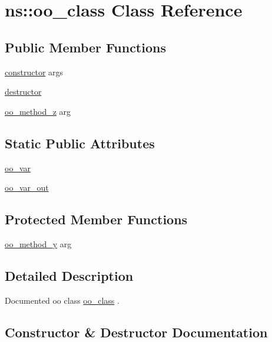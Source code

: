 \hypertarget{classns_1_1oo__class}{}\section{ns\+::oo\+\_\+class Class Reference}
\label{classns_1_1oo__class}
\subsection*{Public Member Functions}
\begin{DoxyCompactItemize}
\item 
\mbox{\hyperlink{classns_1_1oo__class_aa26b64151d4b4b0e8b4977aae7048f9b}{constructor}} args
\item 
\mbox{\hyperlink{classns_1_1oo__class_af148cfc1c090a05986c68ac9452a510a}{destructor}}
\item 
\mbox{\hyperlink{classns_1_1oo__class_a8a3cfbae3b3fca463f08adb9174a5fe8}{oo\+\_\+method\+\_\+z}} arg
\end{DoxyCompactItemize}
\subsection*{Static Public Attributes}
\begin{DoxyCompactItemize}
\item 
\mbox{\hyperlink{classns_1_1oo__class_a741f11f4a2db3876205658d4a9a279ba}{oo\+\_\+var}}
\item 
\mbox{\hyperlink{classns_1_1oo__class_af46293ede16067c38ca2901416cad8ee}{oo\+\_\+var\+\_\+out}}
\end{DoxyCompactItemize}
\subsection*{Protected Member Functions}
\begin{DoxyCompactItemize}
\item 
\mbox{\hyperlink{classns_1_1oo__class_ad07feb192f34010ed66d123338c7acdd}{oo\+\_\+method\+\_\+y}} arg
\end{DoxyCompactItemize}


\subsection{Detailed Description}
Documented oo class {\ttfamily \mbox{\hyperlink{classns_1_1oo__class}{oo\+\_\+class}}} . 

\subsection{Constructor \& Destructor Documentation}
\mbox{\label{classns_1_1oo__class_aa26b64151d4b4b0e8b4977aae7048f9b}} 
